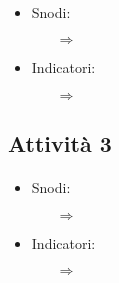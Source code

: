 \paragraph{}

\begin{itemize}
    \item Snodi:
    \begin{itemize}
        \item [$\Rightarrow$]
    \end{itemize}
    \item Indicatori:
    \begin{itemize}
        \item [$\Rightarrow$]
    \end{itemize}
\end{itemize}

\subsection{Attività 3}

\paragraph{}

\begin{itemize}
    \item Snodi:
    \begin{itemize}
        \item [$\Rightarrow$]
    \end{itemize}
    \item Indicatori:
    \begin{itemize}
        \item [$\Rightarrow$]
    \end{itemize}
\end{itemize}